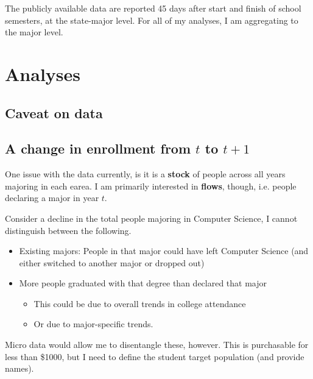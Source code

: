 \documentclass[12pt]{article}
\begin{document}
 The publicly available data are reported 45 days after start and finish of school semesters, at the state-major level. For all of my analyses, I am aggregating to the major level. 


\section{Analyses}
\subsection{Caveat on data}
\subsection{A change in enrollment from $t$ to $t+1$}
One issue with the data currently, is it is a \textbf{stock} of people across all years majoring in each earea. I am primarily interested in \textbf{flows}, though, i.e. people declaring a major in year $t$.

Consider a decline in the total people majoring in Computer Science, I cannot distinguish between the following. 
\begin{itemize}
\item Existing majors: People in that major could have left Computer Science (and either switched to another major or dropped out)
\item More people graduated with that degree than declared that major 
\begin{itemize}
\item This could be due to overall trends in college attendance
\item Or due to major-specific trends.
\end{itemize}
\end{itemize}

Micro data would allow me to disentangle these, however. This is purchasable for less than \$1000, but I need to define the student target population (and provide names).
\end{document}
